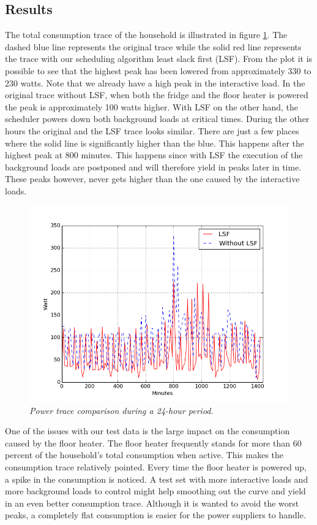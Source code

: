 \subsection{Results}
The total consumption trace of the household is illustrated in figure \ref{CompPlots}. The dashed blue line represents the original trace while the solid red line represents the trace with our scheduling algorithm least slack first (LSF). From the plot it is possible to see that the highest peak has been lowered from approximately 330 to 230 watts. Note that we already have a high peak in the interactive load. In the original trace without LSF, when both the fridge and the floor heater is powered  the peak is approximately 100 watts higher. With LSF on the other hand, the scheduler powers down both background loads at critical times. During the other hours the original and the LSF trace looks similar. There are just a few places where the solid line is significantly higher than the blue. This happens after the highest peak at 800 minutes. This happens since with LSF the execution of the background loads are postponed and will therefore yield in peaks later in time. These peaks however, never gets higher than the one caused by the interactive loads.

\begin{figure}[!ht]
\centering
\includegraphics[width=1.0\textwidth]{img/comparizon.png}
\caption[Difference]{\emph{\small Power trace comparison during a 24-hour period.}}
\label{CompPlots}
\end{figure}

One of the issues with our test data is the large impact on the consumption caused by the floor heater. The floor heater frequently stands for more than 60 percent of the household's total consumption when active. This makes the consumption trace relatively pointed. Every time the floor heater is powered up, a spike in the consumption is noticed. A test set with more interactive loads and more background loads to control might help smoothing out the curve and yield in an even better consumption trace. Although it is wanted to avoid the worst peaks, a completely flat consumption is easier for the power suppliers to handle.

